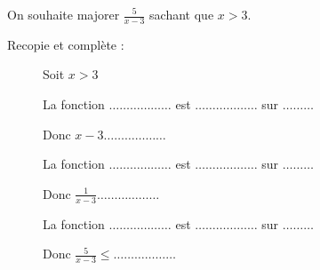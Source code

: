 
On souhaite majorer $\frac{5}{x-3}$ sachant que $x > 3$.

Recopie et complète :
\begin{description}
\item[] Soit $x > 3$
\item[] La fonction $\ldots \ldots  \ldots  \ldots  \ldots  \ldots $ est $\ldots \ldots  \ldots  \ldots  \ldots  \ldots $ sur $ \ldots  \ldots  \ldots $
\item[] Donc $x-3 \ldots \ldots  \ldots  \ldots  \ldots  \ldots $
\item[] La fonction $\ldots \ldots  \ldots  \ldots  \ldots  \ldots $ est $\ldots \ldots  \ldots  \ldots  \ldots  \ldots $ sur $ \ldots  \ldots  \ldots $
\item[] Donc $\frac{1}{x-3} \ldots \ldots  \ldots  \ldots  \ldots  \ldots $
\item[] La fonction $\ldots \ldots  \ldots  \ldots  \ldots  \ldots $ est $\ldots \ldots  \ldots  \ldots  \ldots  \ldots $ sur $ \ldots  \ldots  \ldots $
\item[] Donc $\frac{5}{x-3} \leq \ldots \ldots  \ldots  \ldots  \ldots  \ldots $
\end{description}






